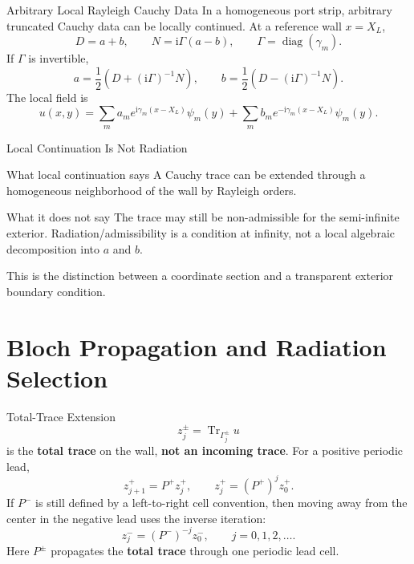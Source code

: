 \documentclass[aspectratio=169]{beamer}
\newcommand{\ii}{\mathrm{i}}
\newcommand{\tr}{\operatorname{Tr}}
\begin{document}

\begin{frame}{Arbitrary Local Rayleigh Cauchy Data}
  In a homogeneous port strip, arbitrary truncated Cauchy data can be locally
  continued.  At a reference wall \(x=X_L\),
  \[
    D=a+b,
    \qquad
    N=\ii\Gamma(a-b),
    \qquad
    \Gamma=\operatorname{diag}(\gamma_m).
  \]
  If \(\Gamma\) is invertible,
  \[
    a=\frac12\left(D+(\ii\Gamma)^{-1}N\right),
    \qquad
    b=\frac12\left(D-(\ii\Gamma)^{-1}N\right).
  \]
  The local field is
  \[
    u(x,y)=
    \sum_m a_m e^{\ii\gamma_m(x-X_L)}\psi_m(y)
    +
    \sum_m b_m e^{-\ii\gamma_m(x-X_L)}\psi_m(y).
  \]
\end{frame}

\begin{frame}{Local Continuation Is Not Radiation}
  \begin{block}{What local continuation says}
    A Cauchy trace can be extended through a homogeneous neighborhood of the
    wall by Rayleigh orders.
  \end{block}
  \begin{alertblock}{What it does not say}
    The trace may still be non-admissible for the semi-infinite exterior.
    Radiation/admissibility is a condition at infinity, not a local algebraic
    decomposition into \(a\) and \(b\).
  \end{alertblock}
  This is the distinction between a coordinate section and a transparent
  exterior boundary condition.
\end{frame}

\section{Bloch Propagation and Radiation Selection}

\begin{frame}{Total-Trace Extension}
  \[
    z_j^\pm=\tr_{\Gamma_j^\pm}u
  \]
  is the \textbf{total trace} on the wall, \textbf{not an incoming trace}.
  For a positive periodic lead,
  \[
    z_{j+1}^+ = P^+ z_j^+,
    \qquad
    z_j^+=(P^+)^jz_0^+.
  \]
  If \(P^-\) is still defined by a left-to-right cell convention, then moving
  away from the center in the negative lead uses the inverse iteration:
  \[
    z_j^-=(P^-)^{-j}z_0^-,
    \qquad j=0,1,2,\ldots.
  \]
  Here \(P^\pm\) propagates the \textbf{total trace} through one periodic lead
  cell.
\end{frame}
\end{document}
